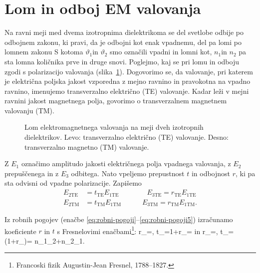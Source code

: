 \section{Lom in odboj EM valovanja}

Na ravni meji med dvema izotropnima dielektrikoma se del svetlobe
odbije po odbojnem zakonu, ki pravi, da je odbojni kot enak vpadnemu, 
del pa lomi po lomnem zakonu 
S kotoma $\vartheta_{1}$in $\vartheta_{2}$ smo označili vpadni in lomni
kot, $n_{1}$in $n_{2}$ pa sta lomna količnika prve in druge snovi.
Poglejmo, kaj se pri lomu in odboju zgodi s polarizacijo valovanja (slika~\ref{fig:Lom}).
Dogovorimo se, da valovanje, pri katerem je električna poljska jakost vzporedna z mejno 
ravnino in pravokotna na vpadno ravnino, imenujemo transverzalno električno
(TE) valovanje. Kadar leži v mejni ravnini 
jakost magnetnega polja, govorimo o transverzalnem magnetnem valovanju 
(TM).\\

\begin{figure}[h]
\centering {} 
  
\caption{Lom elektromagnetnega valovanja na meji dveh izotropnih dielektrikov. 
Levo: transverzalno električno (TE) valovanje. Desno: transverzalno magnetno (TM) valovanje.}
\label{fig:Lom}
\end{figure}

Z $E_1$ označimo amplitudo jakosti električnega polja vpadnega valovanja, z $E_2$ prepuščenega in z $E_3$ odbitega.
Nato vpeljemo prepustnost $t$ in odbojnost $r$, ki pa sta odvisni od vpadne polarizacije. Zapišemo
\begin{align}
E_{2\mathrm{TE}} & =t_{\mathrm{TE}}E_{1\mathrm{TE}} \qquad \qquad E_{3\mathrm{TE}} =r_{\mathrm{TE}}E_{1\mathrm{TE}}\\
E_{2\mathrm{TM}} & =t_{\mathrm{TM}}E_{1\mathrm{TM}} \qquad \quad E_{3\mathrm{TM}}=r_{\mathrm{TM}}E_{1\mathrm{TM}}.
\end{align}

Iz robnih pogojev (enačbe \ref{eq:robni-pogoji}--\ref{eq:robni-pogoji5}) 
izračunamo koeficiente $r$ in $t$ s Fresnelovimi 
enačbami\footnote{Francoski fizik Augustin-Jean Fresnel, 1788--1827.}:
\beq
r_{}=,
\qquad t_{}=1+r_{}=
\eeq
in
\beq
r_{}=,
\qquad t_{}=(1+r_{})=
{n_{1}\cos\vartheta_{2}+n_{2}\cos\vartheta_{1}}.
\eeq

